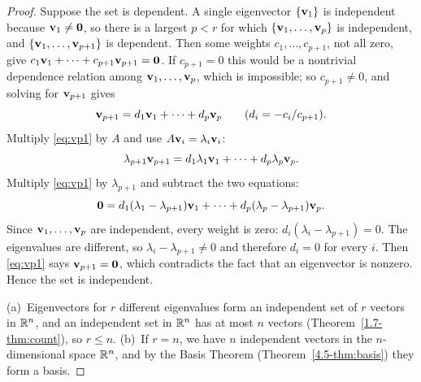 \documentclass[11pt]{article}
\begin{document}
\begin{proof}
Suppose the set is dependent. A single eigenvector $\{\mathbf{v}_1\}$ is independent because $\mathbf{v}_1\neq\mathbf{0}$, so there is a largest $p<r$ for which $\{\mathbf{v}_1,\dots,\mathbf{v}_p\}$ is independent, and $\{\mathbf{v}_1,\dots,\mathbf{v}_{p+1}\}$ is dependent. Then some weights $c_1,\dots,c_{p+1}$, not all zero, give $c_1\mathbf{v}_1+\cdots+c_{p+1}\mathbf{v}_{p+1}=\mathbf{0}$. If $c_{p+1}=0$ this would be a nontrivial dependence relation among $\mathbf{v}_1,\dots,\mathbf{v}_p$, which is impossible; so $c_{p+1}\neq0$, and solving for $\mathbf{v}_{p+1}$ gives
\begin{equation}\label{eq:vp1}
\mathbf{v}_{p+1}=d_1\mathbf{v}_1+\cdots+d_p\mathbf{v}_p\qquad(d_i=-c_i/c_{p+1}).
\end{equation}
Multiply \eqref{eq:vp1} by $A$ and use $A\mathbf{v}_i=\lambda_i\mathbf{v}_i$:
\[
\lambda_{p+1}\mathbf{v}_{p+1}=d_1\lambda_1\mathbf{v}_1+\cdots+d_p\lambda_p\mathbf{v}_p.
\]
Multiply \eqref{eq:vp1} by $\lambda_{p+1}$ and subtract the two equations:
\[
\mathbf{0}=d_1(\lambda_1-\lambda_{p+1})\mathbf{v}_1+\cdots+d_p(\lambda_p-\lambda_{p+1})\mathbf{v}_p.
\]
Since $\mathbf{v}_1,\dots,\mathbf{v}_p$ are independent, every weight is zero: $d_i(\lambda_i-\lambda_{p+1})=0$. The eigenvalues are different, so $\lambda_i-\lambda_{p+1}\neq0$ and therefore $d_i=0$ for every $i$. Then \eqref{eq:vp1} says $\mathbf{v}_{p+1}=\mathbf{0}$, which contradicts the fact that an eigenvector is nonzero. Hence the set is independent.

(a)~Eigenvectors for $r$ different eigenvalues form an independent set of $r$ vectors in $\mathbb{R}^n$, and an independent set in $\mathbb{R}^n$ has at most $n$ vectors (Theorem~\ref{1.7-thm:count}), so $r\le n$. (b)~If $r=n$, we have $n$ independent vectors in the $n$-dimensional space $\mathbb{R}^n$, and by the Basis Theorem (Theorem~\ref{4.5-thm:basis}) they form a basis.
\end{proof}
\end{document}
